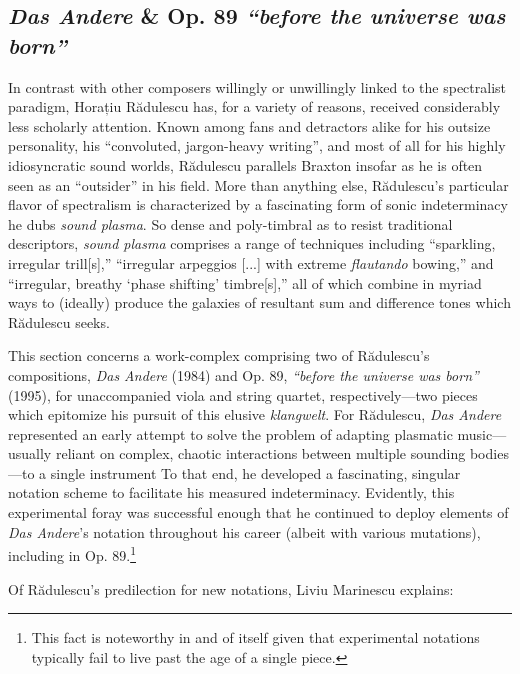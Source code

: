 \subsection{\textit{Das Andere} \& Op. 89 \textit{``before the universe was born''}}

        In contrast with other composers willingly or unwillingly linked to the spectralist paradigm, Horațiu Rădulescu has, for a variety of reasons, received considerably less scholarly attention. Known among fans and detractors alike for his outsize personality, his ``convoluted, jargon-heavy writing'', and most of all for his highly idiosyncratic sound worlds, Rădulescu parallels Braxton insofar as he is often seen as an ``outsider'' in his field.\autocite{Suckling_2018} More than anything else, Rădulescu's particular flavor of spectralism is characterized by a fascinating form of sonic indeterminacy he dubs \textit{sound plasma}. So dense and poly-timbral as to resist traditional descriptors, \textit{sound plasma} comprises a range of techniques including ``sparkling, irregular trill[s],'' ``irregular arpeggios [...] with extreme \textit{flautando} bowing,'' and ``irregular, breathy `phase shifting' timbre[s],'' all of which combine in myriad ways to (ideally) produce the galaxies of resultant sum and difference tones which Rădulescu seeks.\autocite{Heery_2016}
                
        This section concerns a work-complex comprising two of Rădulescu's compositions, \textit{Das Andere} (1984) and Op. 89, \textit{``before the universe was born''} (1995), for unaccompanied viola and string quartet, respectively---two pieces which epitomize his pursuit of this elusive \textit{klangwelt}. For R\u{a}dulescu, \textit{Das Andere} represented an early attempt to solve the problem of adapting plasmatic music---usually reliant on complex, chaotic interactions between multiple sounding bodies---to a single instrument\autocite[10]{Marinescu}  To that end, he developed a fascinating, singular notation scheme to facilitate his measured indeterminacy. Evidently, this experimental foray was successful enough that he continued to deploy elements of \textit{Das Andere}'s notation throughout his career (albeit with various mutations), including in Op. 89.\footnote{This fact is noteworthy in and of itself given that experimental notations typically fail to live past the age of a single piece.} 

        Of R\u{a}dulescu's predilection for new notations, Liviu Marinescu explains:

